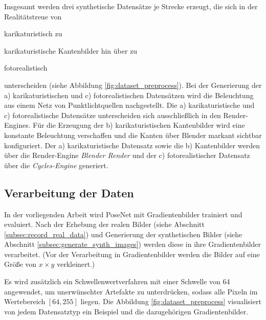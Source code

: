 Insgesamt werden drei synthetische Datensätze je Strecke erzeugt, die sich in der Realitätstreue von \begin{enumerate*}[label=\alph*)]
	\item karikaturistisch zu
	\item karikaturistische Kantenbilder hin über zu
	\item fotorealistisch
\end{enumerate*} unterscheiden (siehe Abbildung \ref{fig:dataset_preprocess}). Bei der Generierung der a) karikaturistischen und c) fotorealistischen Datensätzen wird die Beleuchtung aus einem Netz von Punktlichtquellen nachgestellt. Die a) karikaturistische und c) fotorealistische Datensätze unterscheiden sich ausschließlich in den Render-Engines.
Für die Erzeugung der b) karikaturistischen Kantenbilder wird eine konstante Beleuchtung verschaffen und die Kanten über Blender markant sichtbar konfiguriert. Der a) karikaturistische Datensatz sowie die b) Kantenbilder werden über die Render-Engine \textit{Blender Render} und der c) fotorealistischer Datensatz über die \textit{Cycles-Engine} generiert.



\subsection{Verarbeitung der Daten}
In der vorliegenden Arbeit wird PoseNet mit Gradientenbilder trainiert und evaluiert. Nach der Erhebung der realen Bilder (siehe Abschnitt \ref{subsec:record_real_data}) und Generierung der synthetischen Bilder (siehe Abschnitt \ref{subsec:generate_synth_images}) werden diese in ihre Gradientenbilder verarbeitet. 
(Vor der Verarbeitung in Gradientenbilder werden die Bilder auf eine Größe von $x \times y$ verkleinert.)


Es wird zusätzlich ein Schwellenwertverfahren mit einer Schwelle von 64 angewendet, um unerwünschter Artefakte zu unterdrücken, sodass alle Pixeln im Wertebereich $[64, 255]$ liegen. Die Abbildung \ref{fig:dataset_preprocess} visualisiert von jedem Datensatztyp ein Beispiel und die dazugehörigen Gradientenbilder.

